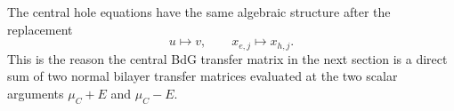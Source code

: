 The central hole equations have the same algebraic structure after the replacement
\begin{equation}
    u\mapsto v,
    \qquad
    x_{e,j}\mapsto x_{h,j}.
    \label{eq:central-hole-map}
\end{equation}
This is the reason the central BdG transfer matrix in the next section is a direct sum of two normal bilayer transfer matrices evaluated at the two scalar arguments $\mu_C+E$ and $\mu_C-E$.
